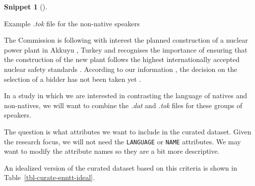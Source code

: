 \documentclass[
  letterpaper,
  krantz1]{latex/krantz-mod}
\newenvironment{Shaded}{\begin{snugshade}}{\end{snugshade}}
\newcommand{\NormalTok}[1]{\textcolor[rgb]{0.00,0.00,0.00}{#1}}
\theoremstyle{definition}
\newtheorem{definition}{Snippet}[chapter]
\theoremstyle{definition}
\theoremstyle{remark}
\begin{document}
\pagebreak

\begin{definition}[]\protect\hypertarget{def-curate-enntt-nonnatives-tok}{}\label{def-curate-enntt-nonnatives-tok}

Example \emph{.tok} file for the non-native speakers

\begin{Shaded}
\begin{Highlighting}[]
\NormalTok{The Commission is following with interest the planned construction of a nuclear power plant in Akkuyu , Turkey and recognises the importance of ensuring that the construction of the new plant follows the highest internationally accepted nuclear safety standards .}
\NormalTok{According to our information , the decision on the selection of a bidder has not been taken yet .}
\end{Highlighting}
\end{Shaded}

\end{definition}

In a study in which we are interested in contrasting the language of
natives and non-natives, we will want to combine the \emph{.dat} and
\emph{.tok} files for these groups of speakers.

The question is what attributes we want to include in
the curated dataset. Given the research focus, we will not need the
\texttt{LANGUAGE} or \texttt{NAME} attributes. We may want to modify the
attribute names so they are a bit more descriptive.

An idealized version of the curated dataset based on this criteria is
shown in Table~\ref{tbl-curate-enntt-ideal}.
\end{document}
